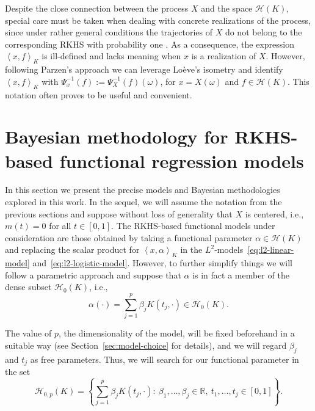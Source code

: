 \documentclass[ba]{imsart}
\numberwithin{equation}{section}
\theoremstyle{plain}
\newcommand{\R}{\mathbb{R}}
\newcommand\dotprod[2]{\left\langle #1, #2 \right\rangle}
\begin{document}
Despite the close connection between the process \(X\) and the space \(\mathcal H(K)\), special care must be taken when dealing with concrete realizations of the process, since under rather general conditions the trajectories of \(X\) do not belong to the corresponding RKHS with probability one \citep[see for example][Cor.~7.1]{lukic2001stochastic}. As a consequence, the expression \(\dotprod{x}{f}_K\) is ill-defined and lacks meaning when \(x\) is a realization of \(X\). However, following Parzen's approach \citep[Th.~4E]{parzen1961approach} we can leverage Loève's isometry and identify \(\dotprod{x}{f}_K \) with \( \Psi_x^{-1}(f) := \Psi_X^{-1}(f)(\omega)\), for \(x=X(\omega)\) and \(f\in \mathcal H(K)\). This notation often proves to be useful and convenient.

\section{Bayesian methodology for RKHS-based functional regression models}\label{sec:methodology}

In this section we present the precise models and Bayesian methodologies explored in this work. In the sequel, we will assume the notation from the previous sections and suppose without loss of generality that \(X\) is centered, i.e., \(m(t)=0\) for all \(t\in[0, 1]\). The RKHS-based functional models under consideration are those obtained by taking a functional parameter \(\alpha \in \mathcal H(K)\) and replacing the scalar product for \(\dotprod{x}{\alpha}_K\) in the \(L^2\)-models~\eqref{eq:l2-linear-model} and~\eqref{eq:l2-logistic-model}. However, to further simplify things we will follow a parametric approach and suppose that \(\alpha\) is in fact a member of the dense subset \(\mathcal H_0(K)\), i.e.,
\begin{equation}\label{eq:alpha-parameter-rkhs}
  \alpha(\cdot) = \sum_{j=1}^p \beta_j K(t_j, \cdot) \in \mathcal H_0(K).
\end{equation}

The value of \(p\), the dimensionality of the model, will be fixed beforehand in a suitable way (see Section~\ref{sec:model-choice} for details), and we will regard \(\beta_j\) and \(t_j\) as free parameters. Thus, we will search for our functional parameter in the set
\[
\mathcal H_{0,p}(K)=\left\{ \sum_{j=1}^p \beta_j K(t_j, \cdot): \ \beta_1,\dots,\beta_j \in \R, \ t_1,\dots,t_j \in [0, 1]\right\}.
\]
\end{document}
